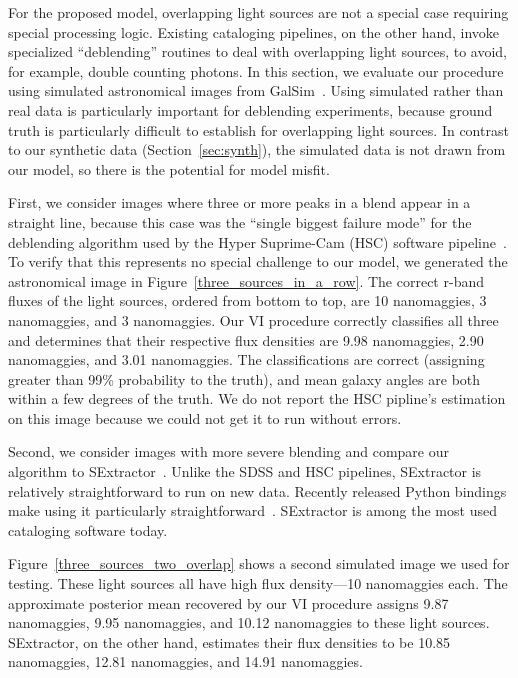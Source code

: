For the proposed model, overlapping light sources are not a special case requiring special processing logic.
Existing cataloging pipelines, on the other hand, invoke specialized ``deblending'' routines to deal with overlapping light sources, to avoid, for example, double counting photons.
In this section, we evaluate our procedure using simulated astronomical images from GalSim~\citep{rowe2015galsim}.
Using simulated rather than real data is particularly important for deblending experiments, because ground truth is particularly difficult to establish for overlapping light sources.
In contrast to our synthetic data (Section~\ref{sec:synth}), the simulated data is not drawn from our model, so there is the potential for model misfit.%

First, we consider images where three or more peaks in a blend appear in a straight line,
because this case was the ``single biggest failure mode'' for the deblending algorithm used by the Hyper Suprime-Cam (HSC) software pipeline~\citep{bosch2018hyper}.
To verify that this represents no special challenge to our model, we generated the astronomical image in Figure~\ref{three_sources_in_a_row}.
The correct r-band fluxes of the light sources, ordered from bottom to top, are 10 nanomaggies, 3 nanomaggies, and 3 nanomaggies.
Our VI procedure correctly classifies all three and determines that their respective flux densities are 9.98 nanomaggies, 2.90 nanomaggies, and 3.01 nanomaggies. The classifications are correct (assigning greater than 99\% probability to the truth), and mean galaxy angles are both within a few degrees of the truth.
We do not report the HSC pipline's estimation on this image because we could not get it to run without errors.

Second, we consider images with more severe blending and compare our algorithm to SExtractor~\citep{bertin1996sextractor}.
Unlike the SDSS and HSC pipelines, SExtractor is relatively straightforward to run on new data.
Recently released Python bindings make using it particularly straightforward~\citep{barbary2016sep}.
SExtractor is among the most used cataloging software today.

Figure~\ref{three_sources_two_overlap} shows a second simulated image we used for testing.
These light sources all have high flux density---10 nanomaggies each.
The approximate posterior mean recovered by our VI procedure assigns  9.87 nanomaggies, 9.95 nanomaggies, and 10.12 nanomaggies to these light sources.
SExtractor, on the other hand, estimates their flux densities to be 10.85 nanomaggies, 12.81 nanomaggies, and 14.91 nanomaggies.

